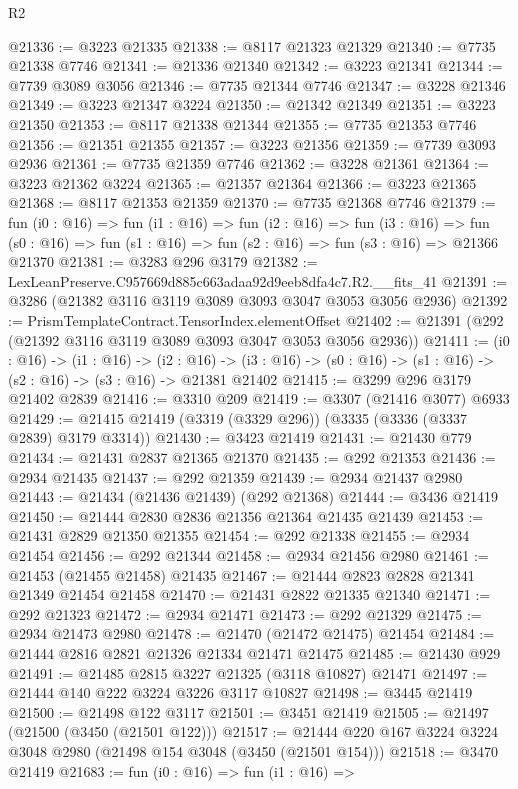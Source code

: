 \begin{lexlean}{R2}
\begin{coremodule}
@21336 := @3223 @21335
@21338 := @8117 @21323 @21329
@21340 := @7735 @21338 @7746
@21341 := @21336 @21340
@21342 := @3223 @21341
@21344 := @7739 @3089 @3056
@21346 := @7735 @21344 @7746
@21347 := @3228 @21346
@21349 := @3223 @21347 @3224
@21350 := @21342 @21349
@21351 := @3223 @21350
@21353 := @8117 @21338 @21344
@21355 := @7735 @21353 @7746
@21356 := @21351 @21355
@21357 := @3223 @21356
@21359 := @7739 @3093 @2936
@21361 := @7735 @21359 @7746
@21362 := @3228 @21361
@21364 := @3223 @21362 @3224
@21365 := @21357 @21364
@21366 := @3223 @21365
@21368 := @8117 @21353 @21359
@21370 := @7735 @21368 @7746
@21379 := fun (i0 : @16) =>
  fun (i1 : @16) =>
  fun (i2 : @16) =>
  fun (i3 : @16) =>
  fun (s0 : @16) => fun (s1 : @16) => fun (s2 : @16) => fun (s3 : @16) => @21366 @21370
@21381 := @3283 @296 @3179
@21382 := LexLeanPreserve.C957669d885c663adaa92d9eeb8dfa4c7.R2.__fits_41
@21391 := @3286 (@21382 @3116 @3119 @3089 @3093 @3047 @3053 @3056 @2936)
@21392 := PrismTemplateContract.TensorIndex.elementOffset
@21402 := @21391 (@292 (@21392 @3116 @3119 @3089 @3093 @3047 @3053 @3056 @2936))
@21411 := (i0 : @16) ->
  (i1 : @16) ->
  (i2 : @16) -> (i3 : @16) -> (s0 : @16) -> (s1 : @16) -> (s2 : @16) -> (s3 : @16) -> @21381 @21402
@21415 := @3299 @296 @3179 @21402 @2839
@21416 := @3310 @209
@21419 := @3307 (@21416 @3077) @6933
@21429 := @21415 @21419 (@3319 (@3329 @296)) (@3335 (@3336 (@3337 @2839) @3179 @3314))
@21430 := @3423 @21419
@21431 := @21430 @779
@21434 := @21431 @2837 @21365 @21370
@21435 := @292 @21353
@21436 := @2934 @21435
@21437 := @292 @21359
@21439 := @2934 @21437 @2980
@21443 := @21434 (@21436 @21439) (@292 @21368)
@21444 := @3436 @21419
@21450 := @21444 @2830 @2836 @21356 @21364 @21435 @21439
@21453 := @21431 @2829 @21350 @21355
@21454 := @292 @21338
@21455 := @2934 @21454
@21456 := @292 @21344
@21458 := @2934 @21456 @2980
@21461 := @21453 (@21455 @21458) @21435
@21467 := @21444 @2823 @2828 @21341 @21349 @21454 @21458
@21470 := @21431 @2822 @21335 @21340
@21471 := @292 @21323
@21472 := @2934 @21471
@21473 := @292 @21329
@21475 := @2934 @21473 @2980
@21478 := @21470 (@21472 @21475) @21454
@21484 := @21444 @2816 @2821 @21326 @21334 @21471 @21475
@21485 := @21430 @929
@21491 := @21485 @2815 @3227 @21325 (@3118 @10827) @21471
@21497 := @21444 @140 @222 @3224 @3226 @3117 @10827
@21498 := @3445 @21419
@21500 := @21498 @122 @3117
@21501 := @3451 @21419
@21505 := @21497 (@21500 (@3450 (@21501 @122)))
@21517 := @21444 @220 @167 @3224 @3224 @3048 @2980 (@21498 @154 @3048 (@3450 (@21501 @154)))
@21518 := @3470 @21419
@21683 := fun (i0 : @16) =>
  fun (i1 : @16) =>

\end{coremodule}
\end{lexlean}
